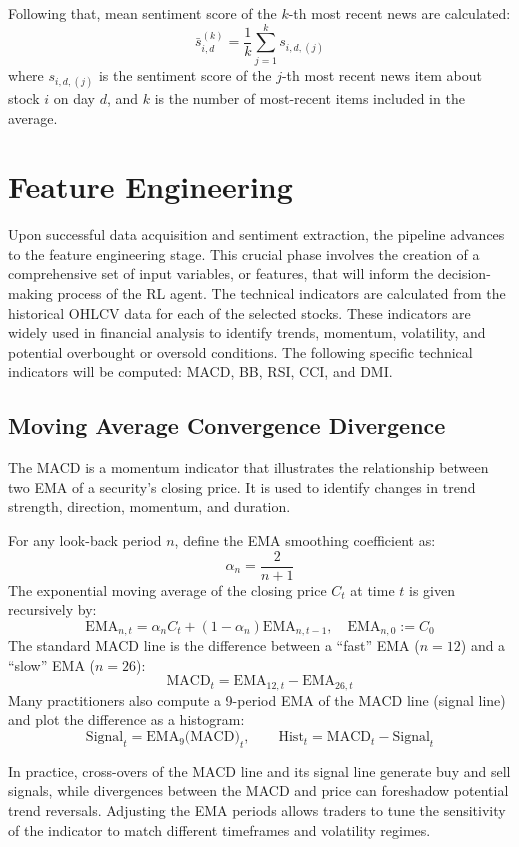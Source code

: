 Following that, mean sentiment score of the \(k\)-th most recent news are calculated:
\[\bar{s}_{i,d}^{(k)} = \frac{1}{k} \sum_{j=1}^{k} s_{i,d,(j)}\]
where \(s_{i,d,(j)}\) is the sentiment score of the \(j\)-th most recent news item about stock \(i\) on day \(d\), and \(k\) is the number of most-recent items included in the average.

\section{Feature Engineering}

Upon successful data acquisition and sentiment extraction, the pipeline advances to the feature engineering stage. This crucial phase involves the creation of a comprehensive set of input variables, or features, that will inform the decision-making process of the \gls{RL} agent. The technical indicators are calculated from the historical \gls{OHLCV} data for each of the selected stocks. These indicators are widely used in financial analysis to identify trends, momentum, volatility, and potential overbought or oversold conditions. The following specific technical indicators will be computed: \gls{MACD}, \gls{BB}, \gls{RSI}, \gls{CCI}, and \gls{DMI}.

\subsection{Moving Average Convergence Divergence}
The \gls{MACD} is a momentum indicator that illustrates the relationship between two \gls{EMA} of a security's closing price. It is used to identify changes in trend strength, direction, momentum, and duration.

For any look-back period \(n\), define the \gls{EMA} smoothing coefficient as:
\[\alpha_n = \frac{2}{n+1}\]
The exponential moving average of the closing price \(C_t\) at time \(t\) is given recursively by:
\[\mathrm{EMA}_{n,t} = \alpha_n C_t + (1 - \alpha_n) \mathrm{EMA}_{n,t-1} , \quad \mathrm{EMA}_{n,0} := C_0\]
The standard \gls{MACD} line is the difference between a “fast” \gls{EMA} (\(n=12\)) and a “slow” \gls{EMA} (\(n=26\)):
\[\mathrm{MACD}_t = \mathrm{EMA}_{12,t} - \mathrm{EMA}_{26,t}\]
Many practitioners also compute a 9-period \gls{EMA} of the \gls{MACD} line (signal line) and plot the difference as a histogram:
\[\mathrm{Signal}_t = \mathrm{EMA}_{9}\bigl(\mathrm{MACD}\bigr)_t, \qquad \mathrm{Hist}_t = \mathrm{MACD}_t - \mathrm{Signal}_t\]

In practice, cross-overs of the \gls{MACD} line and its signal line generate buy and sell signals, while divergences between the \gls{MACD} and price can foreshadow potential trend reversals. Adjusting the \gls{EMA} periods allows traders to tune the sensitivity of the indicator to match different timeframes and volatility regimes.

